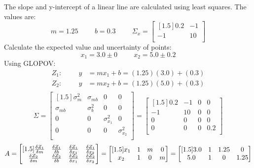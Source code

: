 The slope and y-intercept of a linear line are calculated using least squares.  The values are:
\[
m = 1.25 \hspace{1cm} b = 0.3 \hspace{1cm} \Sigma_x = 
\begin{bmatrix}[1.5]
0.2 & -1 \\
-1 & 10 \\
\end{bmatrix}
\]
Calculate the expected value and uncertainty of points:
\[
x_1 = 3.0\pm 0 \hspace{1cm} x_2 = 5.0 \pm 0.2 
\]
Using GLOPOV:
\begin{align*}
Z_1: \hspace{1cm} y &= mx_1+b = (1.25)(3.0) + (0.3) \\
Z_2: \hspace{1cm} y &= mx_2+b = (1.25)(5.0) + (0.3) \\
\end{align*}
\[
\Sigma = 
\begin{bmatrix}[1.5]
\sigma^2_{m} & \sigma_{mb}  & 0 & 0\\
\sigma_{mb} & \sigma^2_{b}  & 0 & 0\\
0 & 0  & \sigma^2_{x_1} & 0 \\
0 & 0  & 0 & \sigma^2_{x_2} \\
\end{bmatrix}
=
\begin{bmatrix}[1.5]
0.2 & -1  & 0 & 0\\
-1 & 10  & 0 & 0\\
0 & 0  & 0 & 0 \\
0 & 0  & 0 & 0.2 \\
\end{bmatrix}
\]
\[
A = 
\begin{bmatrix}[1.5]
\frac{\delta Z_1}{\delta m} & \frac{\delta Z_1}{\delta b} & \frac{\delta Z_1}{\delta x_1} & \frac{\delta Z_1}{\delta x_2} \\
\frac{\delta Z_2}{\delta m} & \frac{\delta Z_2}{\delta b} & \frac{\delta Z_2}{\delta x_1} & \frac{\delta Z_2}{\delta x_2} \\
\end{bmatrix}
= 
\begin{bmatrix}[1.5]
x_1 & 1 & m & 0 \\
x_2 & 1 & 0 & m \\
\end{bmatrix}
=
\begin{bmatrix}[1.5]
3.0 & 1 & 1.25 & 0 \\
5.0 & 1 & 0 & 1.25 \\
\end{bmatrix}
\]
